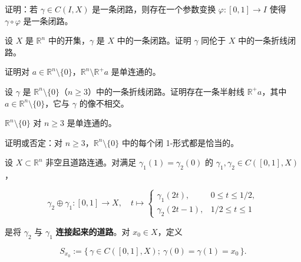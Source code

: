 \begin{exercises}
\item

证明：若 $ \gamma \in C(I,X) $ 是一条闭路，则存在一个参数变换 $ \varphi : [0,1] \to I $ 使得 $ \gamma \circ \varphi $ 是一条闭路。

\item

\begin{items}
\item

设 $ X $ 是 $ \mathbb{R}^{n} $ 中的开集，$ \gamma $ 是 $ X $ 中的一条闭路。证明 $ \gamma $ 同伦于 $ X $ 中的一条折线闭路。

\item

证明对 $ a \in \mathbb{R}^{n}\setminus\{0\} $，$ \mathbb{R}^{n}\setminus\mathbb{R}^{+}a $ 是单连通的。

\item

设 $ \gamma $ 是 $ \mathbb{R}^{n}\setminus\{0\} $（$ n \ge 3 $）中的一条折线闭路。证明存在一条半射线 $ \mathbb{R}^{+}a $，其中 $ a \in \mathbb{R}^{n}\setminus\{0\} $，它与 $ \gamma $ 的像不相交。

\item

\proofhead
$ \mathbb{R}^{n}\setminus\{0\} $ 对 $ n \ge 3 $ 是单连通的。
\end{items}

\item

证明或否定：对 $ n \ge 3 $，$ \mathbb{R}^{n}\setminus\{0\} $ 中的每个闭 1-形式都是恰当的。

\item

设 $ X \subset \mathbb{R}^{n} $ 非空且道路连通。对满足 $ \gamma_{1}(1) = \gamma_{2}(0) $ 的 $ \gamma_{1},\gamma_{2} \in C([0,1],X) $，

\begin{equation*}
\gamma_{2}\oplus\gamma_{1} : [0,1] \to X , \quad t \mapsto \begin{cases} \gamma_{1}(2t) , & 0 \le t \le 1/2 , \\ \gamma_{2}(2t - 1) , & 1/2 \le t \le 1 \end{cases}
\end{equation*}

是将 $ \gamma_{2} $ 与 $ \gamma_{1} $ \textbf{连接起来的道路}。对 $ x_{0} \in X $，定义

\[
S_{x_{0}} := \{\, \gamma \in C([0,1],X) ;\ \gamma(0) = \gamma(1) = x_{0} \,\} .
\]


\end{exercises}
